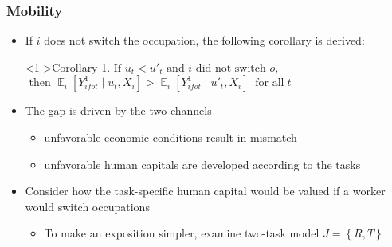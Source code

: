 \documentclass[11pt]{beamer}
\begin{document}
\begin{frame}
	\frametitle{Mobility}
	\begin{itemize}
		\item If $i$ does not switch the occupation, the following corollary is derived:
		\begin{block}<1->{Corollary 1.}
			$\text{If }u_t < u'_{t} \text{ and } i \text{ did not switch }o,$\\
			$\text{ then } \mathop{{}\mathbb{E}}_{i} \left[Y_{ifot}^1 \mid u_t, X_i \right] > \mathop{{}\mathbb{E}}_{i} \left[Y_{ifot}^1 \mid u'_{t}, X_i \right]\;\;\text{for all}\; t$
		\end{block}	
		\item The gap is driven by the two channels
		\begin{itemize}
			\item unfavorable economic conditions result in mismatch 
			\item unfavorable human capitals are developed according to the tasks 
		\end{itemize}
		\item Consider how the task-specific human capital would be valued if a worker would switch occupations
		\begin{itemize}
			\item To make an exposition simpler, examine two-task model $J = \left\lbrace R, T \right\rbrace $
		\end{itemize}
	\end{itemize}
\end{frame}
\end{document}
